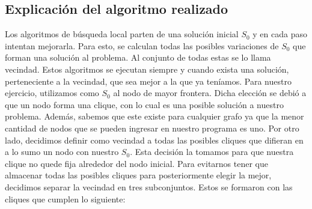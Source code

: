 \subsection{Explicación del algoritmo realizado}
Los algoritmos de búsqueda local parten de una solución inicial $S_{0}$ y en cada paso intentan mejorarla. Para esto, se calculan todas las posibles variaciones de $S_{0}$ que forman una solución al problema. Al conjunto de todas estas se lo llama vecindad. 
Estos algoritmos se ejecutan siempre y cuando exista una solución, perteneciente a la vecindad, que sea mejor a la que ya teníamos. \newline \newline
Para nuestro ejercicio, utilizamos como $S_{0}$ al nodo de mayor frontera. Dicha elección se debió a que un nodo forma una clique, con lo cual es una posible solución a nuestro problema. Además, sabemos que este existe para cualquier grafo ya que la menor cantidad de nodos que se pueden ingresar en nuestro programa es uno. 
\newline Por otro lado, decidimos definir como vecindad a todas las posibles cliques que difieran en a lo sumo un nodo con nuestro $S_{0}$. Esta decisión la tomamos para que nuestra clique no quede fija alrededor del nodo inicial. Para evitarnos tener que almacenar todas las posibles cliques para posteriormente elegir la mejor, decidimos separar la vecindad en tres subconjuntos. Estos se formaron con las cliques que cumplen lo siguiente:
